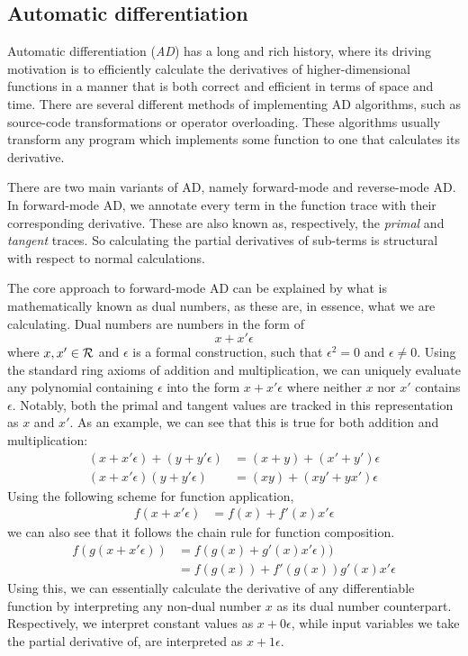 \subsection{Automatic differentiation}
Automatic differentiation (\textit{AD}) has a long and rich history, where its driving motivation is to efficiently calculate the derivatives of higher-dimensional functions in a manner that is both correct and efficient in terms of space and time\cite{Baydin2015AutomaticDI}.
There are several different methods of implementing AD algorithms, such as source-code transformations or operator overloading.
These algorithms usually transform any program which implements some function to one that calculates its derivative.

There are two main variants of AD, namely forward-mode and reverse-mode AD.
In forward-mode AD, we annotate every term in the function trace with their corresponding derivative.
These are also known as, respectively, the \emph{primal} and \emph{tangent} traces.
So calculating the partial derivatives of sub-terms is structural with respect to normal calculations.

The core approach to forward-mode AD can be explained by what is mathematically known as dual numbers, as these are, in essence, what we are calculating\cite{Baydin2015AutomaticDI}.
Dual numbers are numbers in the form of
$$
  x + x' \epsilon
$$
where $x, x' \in \mathcal{R}$ and $\epsilon$ is a formal construction, such that $\epsilon^2 = 0$ and $\epsilon \neq 0$.
Using the standard ring axioms of addition and multiplication, we can uniquely evaluate any polynomial containing $\epsilon$ into the form $x + x'\epsilon$ where neither $x$ nor $x'$ contains $\epsilon$.
Notably, both the primal and tangent values are tracked in this representation as $x$ and $x'$.
As an example, we can see that this is true for both addition and multiplication:
\begin{align*}
  (x + x' \epsilon) + (y + y' \epsilon) &= (x + y) + (x' + y')\epsilon \\
  (x + x' \epsilon)(y + y' \epsilon) &= (xy) + (xy' + yx')\epsilon
\end{align*}
Using the following scheme for function application,
\begin{align*}
  f(x + x' \epsilon) &= f(x) + f'(x)x'\epsilon
\end{align*}
we can also see that it follows the chain rule for function composition.
\begin{align*}
  f(g(x + x' \epsilon)) &= f(g(x) + g'(x)x'\epsilon)) \\
    &= f(g(x)) + f'(g(x))g'(x)x'\epsilon
\end{align*}
Using this, we can essentially calculate the derivative of any differentiable function by interpreting any non-dual number $x$ as its dual number counterpart. Respectively, we interpret constant values as $x + 0\epsilon$, while input variables we take the partial derivative of, are interpreted as $x + 1\epsilon$.

